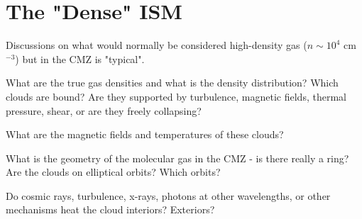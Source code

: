\section{The "Dense" ISM}
Discussions on what would normally be considered high-density gas ($n\sim10^4$ cm$^{-3}$) but in the CMZ is "typical".

What are the true gas densities and what is the density distribution?  Which clouds are bound?  Are they supported by turbulence, magnetic fields, thermal pressure, shear, or are they freely collapsing?

What are the magnetic fields and temperatures of these clouds?

What is the geometry of the molecular gas in the CMZ - is there really a ring?  Are the clouds on elliptical orbits?  Which orbits?

Do cosmic rays, turbulence, x-rays, photons at other wavelengths, or other mechanisms heat the cloud interiors?  Exteriors?